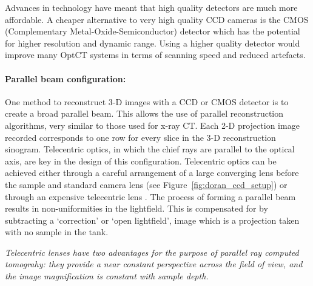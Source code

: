 \documentclass[12pt]{article}
\begin{document}

Advances in technology have meant that  high quality detectors are much more affordable. A cheaper alternative to very high quality CCD cameras is the CMOS (Complementary Metal-Oxide-Semiconductor) detector which has the potential for higher resolution and dynamic range. \cite{Doran:2008kh} Using a higher quality detector would improve many OptCT systems  in terms of scanning speed and reduced artefacts. \cite{Tarte:2007, Doran:2001ee}


\paragraph{Parallel beam configuration:} One method to reconstruct 3-D images with a CCD or CMOS detector is to create a broad parallel beam. This allows the use of parallel reconstruction algorithms, very similar to those used for x-ray CT. Each 2-D projection image recorded corresponds to one row for every slice in the 3-D reconstruction sinogram. \cite{Doran:2008kh}
Telecentric optics, in which the chief rays are parallel to the optical axis, are key in the design of this configuration. \cite{Walls:2005ja} Telecentric optics can be achieved either through a careful arrangement  of  a large converging lens before the sample and standard camera lens  \cite{Doran:2001ee} (see Figure~\ref{fig:doran_ccd_setup}) or through an expensive telecentric lens \cite{Sakhalkar:2008exa}. The process of forming a parallel beam results in non-uniformities in the lightfield. This is compensated for by subtracting a `correction' or `open lightfield', image which is a projection taken with no sample in the tank. \cite{Doran:2001ee}

\textit{Telecentric lenses have two advantages for the purpose of parallel ray computed tomograhy: they provide a near constant perspective across the field of view, and the image magnification is constant with sample depth.} \cite{Oldham:2007ku}
\end{document}
